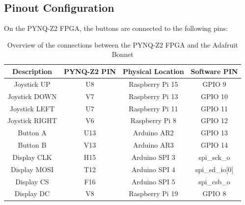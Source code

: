 \subsection{Pinout Configuration}

On the PYNQ-Z2 FPGA, the buttons are connected to the following pins:

\begin{table}[ht]
    \centering
    \begin{tabular}{|c|c|c|c|}
        \hline
        \textbf{Description} & \textbf{PYNQ-Z2 PIN} & \textbf{Physical Location} & \textbf{Software PIN} \\
        \hline
        \hline
        Joystick UP & U8 & Raspberry Pi 15 & GPIO 9 \\
        \hline
        Joystick DOWN & V7 & Raspberry Pi 13 & GPIO 10 \\
        \hline
        Joystick LEFT & U7 & Raspberry Pi 11 & GPIO 11 \\
        \hline
        Joystick RIGHT & V6 & Raspberry Pi 8 & GPIO 12 \\
        \hline
        Button A & U13 & Arduino AR2 & GPIO 13 \\
        \hline
        Button B & V13 & Arduino AR3 & GPIO 14 \\
        \hline
        \hline
        Display CLK & H15 & Arduino SPI 3 & spi\_sck\_o \\
        \hline
        Display MOSI & T12 & Arduino SPI 4 & spi\_sd\_io[0] \\
        \hline
        Display CS & F16 & Arduino SPI 5 & spi\_csb\_o \\
        \hline
        Display DC & V8 & Raspberry Pi 19 & GPIO 8 \\
        \hline
    \end{tabular}
    \caption{Overview of the connections between the PYNQ-Z2 FPGA and the Adafruit Bonnet}
    \label{table:pinout_Adafruit}
\end{table}